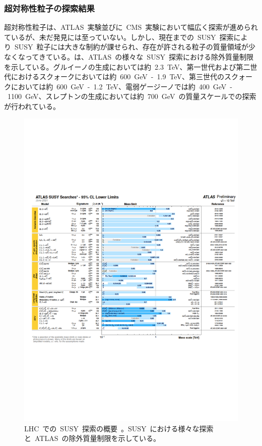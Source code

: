 \subsubsection{超対称性粒子の探索結果}
超対称性粒子は、ATLAS~実験並びに~CMS~実験において幅広く探索が進められているが、未だ発見には至っていない。しかし、現在までの~SUSY~探索により~SUSY~粒子には大きな制約が課せられ、存在が許される粒子の質量領域が少なくなってきている。は、ATLAS~の様々な~SUSY~探索における除外質量制限を示している。グルイーノの生成においては約~2.3~TeV、第一世代および第二世代におけるスクォークにおいては約~600~GeV~-~1.9~TeV、第三世代のスクォークにおいては約~600~GeV~-~1.2~TeV、電弱ゲージーノでは約~400~GeV~-~1100~GeV、スレプトンの生成においては約~700~GeV~の質量スケールでの探索が行われている。

\begin{figure}[H]
        \centering   
        \includegraphics[width=\textwidth,page=1]{img/pdf/susy1.pdf}
        \caption[LHC~での~SUSY~探索の概要]{LHC~での~SUSY~探索の概要~\cite{AR:13}。SUSY~における様々な探索と~ATLAS~の除外質量制限を示している。}\label{fig:susy1}
\end{figure}


